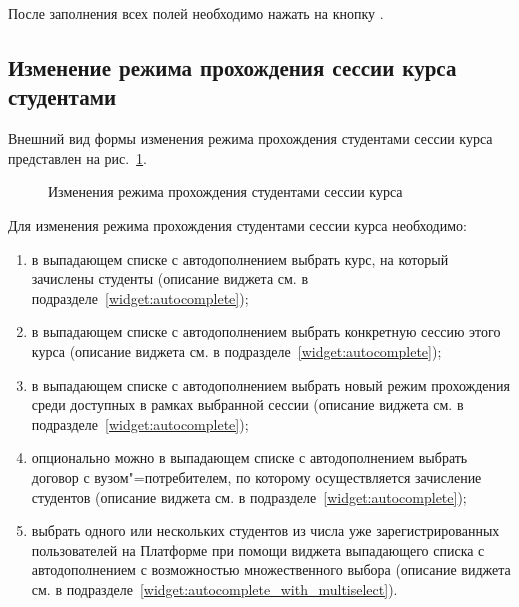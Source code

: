 После заполнения всех полей необходимо нажать на кнопку .

\subsection{Изменение режима прохождения сессии курса студентами}
Внешний вид формы изменения режима прохождения студентами сессии курса представлен на рис.~\ref{img:student:change_mode}.


\begin{figure}[H]
	\caption{Изменения режима прохождения студентами сессии курса}
	\label{img:student:change_mode}
\end{figure}

Для изменения режима прохождения студентами сессии курса необходимо:
\begin{enumerate}
	\item в выпадающем списке с автодополнением выбрать курс, на который зачислены студенты 
	(описание виджета см. в подразделе~\ref{widget:autocomplete});
	\item в выпадающем списке с автодополнением выбрать конкретную сессию этого курса 
	(описание виджета см. в подразделе~\ref{widget:autocomplete});
	\item в выпадающем списке с автодополнением выбрать новый режим прохождения среди доступных в рамках выбранной сессии 
	(описание виджета см. в подразделе~\ref{widget:autocomplete});
	\item опционально можно в выпадающем списке с автодополнением выбрать договор с вузом"=потребителем, 
	по которому осуществляется зачисление студентов (описание виджета см. в подразделе~\ref{widget:autocomplete});
	\item выбрать одного или нескольких студентов из числа уже зарегистрированных пользователей на Платформе при помощи 
	виджета выпадающего списка с автодополнением с возможностью множественного выбора 
	(описание виджета см. в подразделе~\ref{widget:autocomplete_with_multiselect}). 
\end{enumerate}

